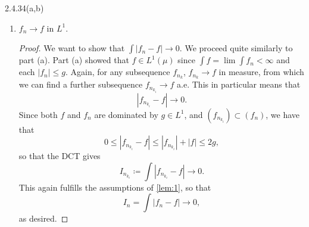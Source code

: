 \documentclass[11pt]{article}
\begin{document}
\begin{problem}{2.4.34(a,b)}
\begin{enumerate}[label=(\alph*)]
\begin{proof}
    Since our sequences \( I_n, I_{n_k}, I_{n_{k_i}} \) satisfy the assumptions of the lemma with \( l = \int f \), it is immediate that
    \begin{equation}
    \label{eq:5}
    \int f_n \rightarrow \int f,
  \end{equation}
  as desired.
  \end{proof}
    \item \( f_n \rightarrow f \) in \( L^1 \).
          \begin{proof}
            We want to show that \( \int |f_n - f| \rightarrow 0 \).
            We proceed quite similarly to part (a).
            Part (a) showed that \( f \in L^1(\mu) \) since \( \int f = \lim \int f_n < \infty \) and each \( |f_n| \leq g \).
            Again, for any subsequence \( f_{n_k} \), \( f_{n_k} \rightarrow f \) in measure, from which we can find a further subsequence \( f_{n_{k_i}} \rightarrow f \) a.e.
            This in particular means that
            \begin{equation}
            \label{eq:21}
            |f_{n_{k_i}} - f| \rightarrow 0.
          \end{equation}
          Since both \( f \) and \( f_n \) are dominated by \( g \in L^1 \), and \( (f_{n_{k_i}}) \subset (f_{n}) \), we have that
          \begin{equation}
          \label{eq:26}
          0 \leq |f_{n_{k_i}} - f| \leq |f_{n_{k_i}}| + |f| \le 2g,
        \end{equation}
        so that the DCT gives
          \begin{equation}
            I_{n_{k_i}} \coloneq \int |f_{n_{k_i}} - f| \rightarrow 0.
          \end{equation}
          This again fulfills the assumptions of \cref{lem:1}, so that
          \begin{equation}
          \label{eq:22}
          I_n = \int |f_n - f| \rightarrow 0,
        \end{equation}
        as desired.
          \end{proof}
  \end{enumerate}
\end{problem}
\end{document}
